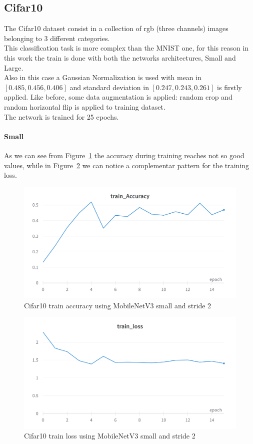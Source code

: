 \documentclass[12pt, letterpaper, twoside]{article}
\begin{document}
\clearpage

\subsection{Cifar10}
The Cifar10 dataset consist in a collection of rgb (three channels) images belonging to 3 different categories.\\
This classification task is more complex than the MNIST one, for this reason in this work the train is done with both the networks architectures, Small and Large.\\
Also in this case a Gaussian Normalization is used with mean in $[0.485, 0.456, 0.406]$ and standard deviation in $[0.247, 0.243, 0.261]$ is firstly applied. Like before, some data augmentation is applied: random crop and random horizontal flip is applied to training dataset.\\
The network is trained for 25 epochs.\\
\paragraph{Small} 
As we can see from Figure~\ref{fig:cifar10_small_stride2_acc} the accuracy during training reaches not so good values, while in Figure~\ref{fig:cifar10_small_stride2_loss} we can notice a complementar pattern for the training loss.\\

\begin{figure}[H]
	\centering
	\includegraphics[width=.7\textwidth]{mnet_small_cifar10_accuracy_stride2.png}
	\caption{Cifar10 train accuracy using MobileNetV3 small and stride 2}
	\label{fig:cifar10_small_stride2_acc}
\end{figure}

\begin{figure}[H]
	\centering
	\includegraphics[width=.7\textwidth]{mnet_small_cifar10_loss_stride2.png}
	\caption{Cifar10 train loss using MobileNetV3 small and stride 2}
	\label{fig:cifar10_small_stride2_loss}
\end{figure}
\end{document}
